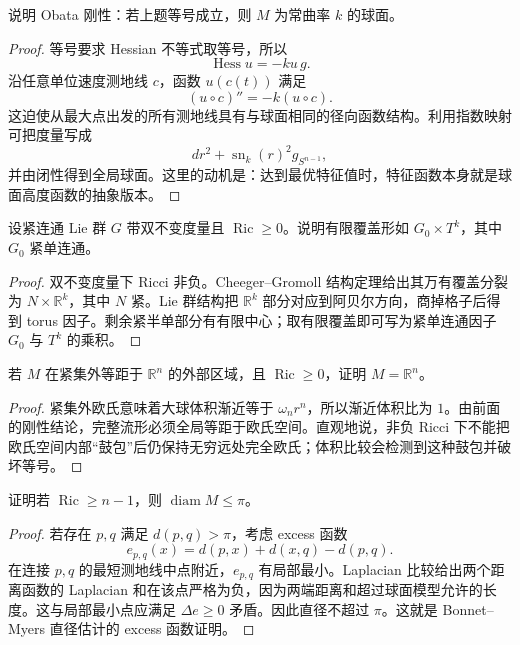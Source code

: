 \documentclass[11pt,a4paper,openany]{ctexbook}
\numberwithin{equation}{chapter}
\begin{document}
\begin{problem}
说明 Obata 刚性：若上题等号成立，则 \(M\) 为常曲率 \(k\) 的球面。
\end{problem}
\begin{proof}
等号要求 Hessian 不等式取等号，所以
\[
\operatorname{Hess}u=-ku\,g.
\]
沿任意单位速度测地线 \(c\)，函数 \(u(c(t))\) 满足
\[
(u\circ c)''=-k(u\circ c).
\]
这迫使从最大点出发的所有测地线具有与球面相同的径向函数结构。利用指数映射可把度量写成
\[
dr^2+\operatorname{sn}_k(r)^2g_{S^{n-1}},
\]
并由闭性得到全局球面。这里的动机是：达到最优特征值时，特征函数本身就是球面高度函数的抽象版本。
\end{proof}

\begin{problem}
设紧连通 Lie 群 \(G\) 带双不变度量且 \(\operatorname{Ric}\ge0\)。说明有限覆盖形如 \(G_0\times T^k\)，其中 \(G_0\) 紧单连通。
\end{problem}
\begin{proof}
双不变度量下 Ricci 非负。Cheeger--Gromoll 结构定理给出其万有覆盖分裂为 \(N\times\mathbb R^k\)，其中 \(N\) 紧。Lie 群结构把 \(\mathbb R^k\) 部分对应到阿贝尔方向，商掉格子后得到 torus 因子。剩余紧半单部分有有限中心；取有限覆盖即可写为紧单连通因子 \(G_0\) 与 \(T^k\) 的乘积。
\end{proof}

\begin{problem}
若 \(M\) 在紧集外等距于 \(\mathbb R^n\) 的外部区域，且 \(\operatorname{Ric}\ge0\)，证明 \(M=\mathbb R^n\)。
\end{problem}
\begin{proof}
紧集外欧氏意味着大球体积渐近等于 \(\omega_nr^n\)，所以渐近体积比为 \(1\)。由前面的刚性结论，完整流形必须全局等距于欧氏空间。直观地说，非负 Ricci 下不能把欧氏空间内部“鼓包”后仍保持无穷远处完全欧氏；体积比较会检测到这种鼓包并破坏等号。
\end{proof}

\begin{problem}
证明若 \(\operatorname{Ric}\ge n-1\)，则 \(\operatorname{diam}M\le\pi\)。
\end{problem}
\begin{proof}
若存在 \(p,q\) 满足 \(d(p,q)>\pi\)，考虑 excess 函数
\[
e_{p,q}(x)=d(p,x)+d(x,q)-d(p,q).
\]
在连接 \(p,q\) 的最短测地线中点附近，\(e_{p,q}\) 有局部最小。Laplacian 比较给出两个距离函数的 Laplacian 和在该点严格为负，因为两端距离和超过球面模型允许的长度。这与局部最小点应满足 \(\Delta e\ge0\) 矛盾。因此直径不超过 \(\pi\)。这就是 Bonnet--Myers 直径估计的 excess 函数证明。
\end{proof}
\end{document}

